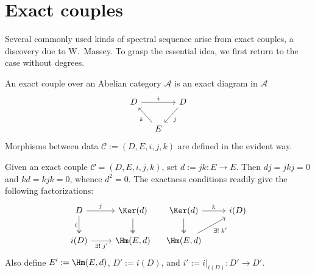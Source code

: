 
\section{Exact couples}\label{sec:exact-couples}
\hypertarget{o014.aljabr2.chapter5.exact-couples}{ }

Several commonly used kinds of spectral sequence arise from exact couples, a
discovery due to W.\ Massey. To grasp the essential idea, we first return to
the case without degrees.

\begin{definition}\label{def:exact-couple}
	An exact couple over an Abelian category $\mathcal{A}$ is an exact diagram
	in $\mathcal{A}$
	\[\begin{tikzcd}[column sep=small]
		D \arrow[rr, "i"] & & D \arrow[ld, "j"] \\
		& E \arrow[lu, "k"] &
	\end{tikzcd}\]
	Morphisms between data $\mathscr{C}:=(D,E,i,j,k)$ are defined in the
	evident way.
\end{definition}

Given an exact couple $\mathscr{C}=(D,E,i,j,k)$, set $d:=jk:E\to E$. Then
$dj=jkj=0$ and $kd=kjk=0$, whence $d^2=0$. The exactness conditions readily
give the following factorizations:
\begin{equation}\label{eqn:exact-couple-aux}
	\begin{tikzcd}
		D \arrow[r, "j"] \arrow[twoheadrightarrow, d, "i"'] &
		\Ker(d) \arrow[twoheadrightarrow, d] \\
		i(D) \arrow[r, "{\exists!\;j'}"'] & \Hm(E,d)
	\end{tikzcd} \quad \begin{tikzcd}
		\Ker(d) \arrow[r, "k"] \arrow[twoheadrightarrow, d] & i(D) \\
		\Hm(E,d) \arrow[ru, "{\exists!\;k'}"'] &
	\end{tikzcd}
\end{equation}
Also define $E':=\Hm(E,d)$, $D':=i(D)$, and
$i':=i|_{i(D)}:D'\to D'$.

